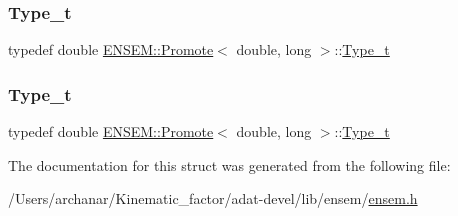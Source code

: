 \mbox{\label{structENSEM_1_1Promote_3_01double_00_01long_01_4_ab38f2aa99a29d60ef8d3393a5fe7d568}} 
\subsubsection{\texorpdfstring{Type\_t}{Type\_t}\hspace{0.1cm}{\footnotesize\ttfamily [2/3]}}
{\footnotesize\ttfamily typedef double \mbox{\hyperlink{structENSEM_1_1Promote}{E\+N\+S\+E\+M\+::\+Promote}}$<$ double, long $>$\+::\mbox{\hyperlink{structENSEM_1_1Promote_3_01double_00_01long_01_4_ab38f2aa99a29d60ef8d3393a5fe7d568}{Type\+\_\+t}}}

\mbox{\label{structENSEM_1_1Promote_3_01double_00_01long_01_4_ab38f2aa99a29d60ef8d3393a5fe7d568}} 
\subsubsection{\texorpdfstring{Type\_t}{Type\_t}\hspace{0.1cm}{\footnotesize\ttfamily [3/3]}}
{\footnotesize\ttfamily typedef double \mbox{\hyperlink{structENSEM_1_1Promote}{E\+N\+S\+E\+M\+::\+Promote}}$<$ double, long $>$\+::\mbox{\hyperlink{structENSEM_1_1Promote_3_01double_00_01long_01_4_ab38f2aa99a29d60ef8d3393a5fe7d568}{Type\+\_\+t}}}



The documentation for this struct was generated from the following file\+:\begin{DoxyCompactItemize}
\item 
/\+Users/archanar/\+Kinematic\+\_\+factor/adat-\/devel/lib/ensem/\mbox{\hyperlink{adat-devel_2lib_2ensem_2ensem_8h}{ensem.\+h}}\end{DoxyCompactItemize}
